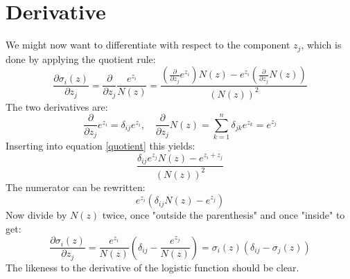 \documentclass[12pt, a4paper]{article}
\numberwithin{equation}{section}
\begin{document}
\section{Derivative}
We might now want to differentiate with respect to the component $z_j$, which is done by applying the quotient rule:
\begin{equation}
\label{quotient}
\frac{\partial\sigma_i(z)}{\partial z_j}=\frac{\partial}{\partial z_j}\frac{e^{z_i}}{N(z)}=\frac{\left(\frac{\partial}{\partial z_j}e^{z_i}\right)N(z)-e^{z_i}\left(\frac{\partial}{\partial z_j}N(z)\right)}{(N(z))^2}
\end{equation}
The two derivatives are:
\begin{equation}
\frac{\partial}{\partial z_j}e^{z_i}=\delta_{ij}e^{z_i},\quad\frac{\partial}{\partial z_j}N(z)=\sum_{k=1}^n\delta_{jk}e^{z_k}=e^{z_j}
\end{equation}
Inserting into equation \ref{quotient} this yields:
\begin{equation}
\frac{\delta_{ij}e^{z_j}N(z)-e^{z_i+z_j}}{(N(z))^2}
\end{equation}
The numerator can be rewritten:
\begin{equation}
e^{z_i}\left(\delta_{ij}N(z)-e^{z_j}\right)
\end{equation}
Now divide by $N(z)$ twice, once "outside the parenthesis" and once "inside" to get:
\begin{equation}
\label{derivative}
\frac{\partial\sigma_i(z)}{\partial z_j}=\frac{e^{z_i}}{N(z)}\left(\delta_{ij}-\frac{e^{z_j}}{N(z)}\right)=\sigma_i(z)\left(\delta_{ij}-\sigma_j(z)\right)
\end{equation}
The likeness to the derivative of the logistic function should be clear.
\end{document}

